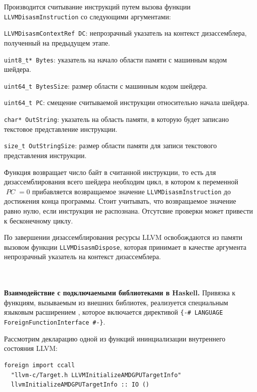 \documentclass[a4paper,14pt]{extarticle}
\newcommand{\topic}[1]{\textbf{#1.}}
\newcommand{\var}[1]{\mathop{\mathit{#1}}}
\begin{document}
{\begin{ol}
\item Производится считывание инструкций путем вызова функции
\verb|LLVMDisasmInstruction| со следующими аргументами:
  \begin{ol}
  \item \verb|LLVMDisasmContextRef DC|: непрозрачный указатель на контекст дизассемблера,
полученный на предыдущем этапе.
  \item \verb|uint8_t* Bytes|: указатель на начало области памяти с машинным кодом шейдера.
  \item \verb|uint64_t BytesSize|: размер области с машинным кодом шейдера.
  \item \verb|uint64_t PC|: смещение считываемой инструкции относительно начала шейдера.
  \item \verb|char* OutString|: указатель на область памяти, в которую будет записано
текстовое представление инструкции.
  \item \verb|size_t OutStringSize|: размер области памяти для записи текстового представления инструкции.
  \end{ol}
Функция возвращает число байт в считанной инструкции, то есть для дизассемблирования всего шейдера необходим цикл,
в котором к переменной $\var{PC}=0$ прибавляется возвращаемое значение \verb|LLVMDisasmInstruction| до
достижения конца программы.
Стоит учитывать, что возвращаемое значение равно нулю, если инструкция не распознана. Отсутсвие проверки
может привести к бесконечному циклу.

\item По завершении дизассемблирования ресурсы LLVM освобождаются из памяти вызовом
функции \verb|LLVMDisasmDispose|, которая принимает в качестве аргумента
непрозрачный указатель на контекст дизассемблера.
\end{ol} \ \\\\ %

\topic{Взаимодействие с подключаемыми библиотеками в Haskell} Привязка к функциям,
вызываемым из внешних библиотек, реализуется специальным языковым расширением
\cite[глава~17]{rwhaskell}, которое включается директивой
\verb|{-# LANGUAGE ForeignFunctionInterface #-}|.

Рассмотрим декларацию одной из функций ининциализации внутреннего состояния LLVM:
\begin{verbatim}
foreign import ccall
  "llvm-c/Target.h LLVMInitializeAMDGPUTargetInfo"
  llvmInitializeAMDGPUTargetInfo :: IO ()
\end{verbatim}

}
\end{document}
